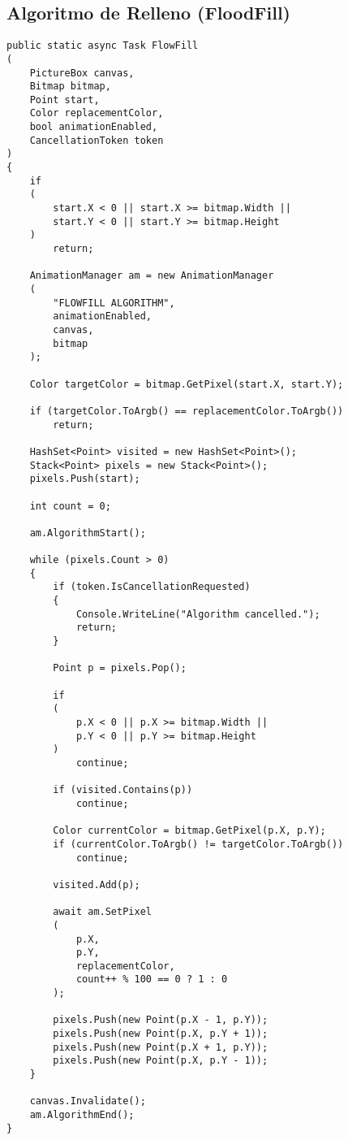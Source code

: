 \documentclass[12pt]{article}
\begin{document}
\subsection{Algoritmo de Relleno (FloodFill)}
\begin{lstlisting}
public static async Task FlowFill
(
    PictureBox canvas,
    Bitmap bitmap,
    Point start,
    Color replacementColor,
    bool animationEnabled,
    CancellationToken token
)
{
    if
    (
        start.X < 0 || start.X >= bitmap.Width ||
        start.Y < 0 || start.Y >= bitmap.Height
    )
        return;

    AnimationManager am = new AnimationManager
    (
        "FLOWFILL ALGORITHM",
        animationEnabled,
        canvas,
        bitmap
    );

    Color targetColor = bitmap.GetPixel(start.X, start.Y);

    if (targetColor.ToArgb() == replacementColor.ToArgb())
        return;

    HashSet<Point> visited = new HashSet<Point>();
    Stack<Point> pixels = new Stack<Point>();
    pixels.Push(start);

    int count = 0;

    am.AlgorithmStart();

    while (pixels.Count > 0)
    {
        if (token.IsCancellationRequested)
        {
            Console.WriteLine("Algorithm cancelled.");
            return;
        }

        Point p = pixels.Pop();

        if
        (
            p.X < 0 || p.X >= bitmap.Width ||
            p.Y < 0 || p.Y >= bitmap.Height
        )
            continue;

        if (visited.Contains(p))
            continue;

        Color currentColor = bitmap.GetPixel(p.X, p.Y);
        if (currentColor.ToArgb() != targetColor.ToArgb())
            continue;

        visited.Add(p);

        await am.SetPixel
        (
            p.X,
            p.Y,
            replacementColor,
            count++ % 100 == 0 ? 1 : 0
        );

        pixels.Push(new Point(p.X - 1, p.Y));
        pixels.Push(new Point(p.X, p.Y + 1));
        pixels.Push(new Point(p.X + 1, p.Y));
        pixels.Push(new Point(p.X, p.Y - 1));
    }

    canvas.Invalidate();
    am.AlgorithmEnd();
}
\end{lstlisting}
\end{document}
